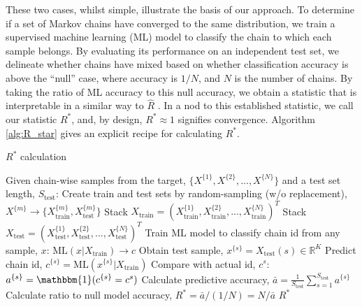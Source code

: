 \documentclass{article}
\begin{document}
These two cases, whilst simple, illustrate the basis of our approach. To determine if a set of Markov chains have converged to the same distribution, we train a supervised machine learning (ML) model to classify the chain to which each sample belongs. By evaluating its performance on an independent test set, we delineate whether chains have mixed based on whether classification accuracy is above the ``null'' case, where accuracy is $1/{N}$, and $N$ is the number of chains. By taking the ratio of ML accuracy to this null accuracy, we obtain a statistic that is interpretable in a similar way to $\hat{R}$ \cite{gelman2013bayesian}. In a nod to this established statistic, we call our statistic $R^*$, and, by design, $R^*\approx 1$ signifies convergence. Algorithm \ref{alg:R_star} gives an explicit recipe for calculating $R^*$.

\begin{algorithm}[tb]
	\caption{$R^*$ calculation}
	\label{alg:R_star}
	\begin{algorithmic}
		\STATE Given chain-wise samples from the target, $\{X^{\{1\}},X^{\{2\}},...,X^{\{N\}}\}$ and a test set length, $S_\text{test}$:
		\STATE Create train and test sets by random-sampling (w/o replacement), $X^{\{m\}}\rightarrow\{X^{\{m\}}_\text{train},X^{\{m\}}_\text{test}\}$
		\ENDFOR
		\STATE Stack $X_\text{train} = (X^{\{1\}}_\text{train},X^{\{2\}}_\text{train},...,X^{\{N\}}_\text{train})^T$
		\STATE Stack $X_\text{test} = (X^{\{1\}}_\text{test},X^{\{2\}}_\text{test},...,X^{\{N\}}_\text{test})^T$
		\STATE Train ML model to classify chain id from any sample, $x$: $\text{ML}(x|X_\text{train}) \rightarrow c$
		\STATE Obtain test sample, $x^{\{s\}}=X_\text{test}(s)\in \mathbb{R}^K$
		\STATE Predict chain id, $c^{\{s\}} = \text{ML}(x^{\{s\}}|X_\text{train})$
		\STATE Compare with actual id, $c^s$: $a^{\{s\}}=\mathbbm{1}(c^{\{s\}}=c^s)$
		\ENDFOR
		\STATE Calculate predictive accuracy, $\bar{a} = \frac{1}{S_\text{test}} \sum_{s=1}^{S_\text{test}} a^{\{s\}}$
		\STATE Calculate ratio to null model accuracy, $R^* = \bar{a} / (1 / N) = N/\bar{a}$
		\RETURN $R^*$
	\end{algorithmic}
\end{algorithm}
\end{document}
